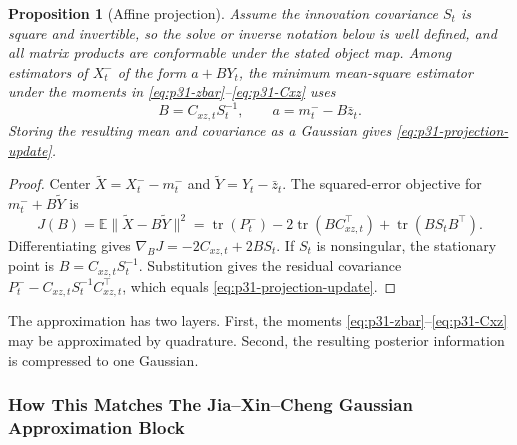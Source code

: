 \documentclass[11pt]{article}
\newtheorem{proposition}{Proposition}
\numberwithin{equation}{section}
\newcommand{\E}{\mathbb E}
\newcommand{\tr}{\operatorname{tr}}
\begin{document}
\begin{proposition}[Affine projection]
\label{prop:p31-affine-projection}
Assume the innovation covariance \(S_t\) is square and invertible, so the solve
or inverse notation below is well defined, and all matrix products are conformable
under the stated object map.  Among estimators of \(X_t^-\) of the form
\(a+B Y_t\), the minimum mean-square estimator under the moments in
\eqref{eq:p31-zbar}--\eqref{eq:p31-Cxz} uses
\begin{equation}
  B=C_{xz,t}S_t^{-1},
  \qquad
  a=m_t^- - B\bar z_t.
  \label{eq:p41-affine-projection-intercept}
\end{equation}
Storing the resulting mean and covariance as a Gaussian gives
\eqref{eq:p31-projection-update}.
\end{proposition}

\begin{proof}
Center \(\widetilde X=X_t^- -m_t^-\) and
\(\widetilde Y=Y_t-\bar z_t\).  The squared-error objective for
\(m_t^-+B\widetilde Y\) is
\begin{equation}
  J(B)=\E\|\widetilde X-B\widetilde Y\|^2
  =
  \tr(P_t^-)-2\tr(BC_{xz,t}^\top)+\tr(BS_tB^\top).
  \label{eq:p31-affine-objective}
\end{equation}
Differentiating gives \(\nabla_BJ=-2C_{xz,t}+2BS_t\).  If \(S_t\) is
nonsingular, the stationary point is \(B=C_{xz,t}S_t^{-1}\).  Substitution gives
the residual covariance \(P_t^- - C_{xz,t}S_t^{-1}C_{xz,t}^\top\), which equals
\eqref{eq:p31-projection-update}.
\end{proof}

The approximation has two layers.  First, the moments
\eqref{eq:p31-zbar}--\eqref{eq:p31-Cxz} may be approximated by quadrature.
Second, the resulting posterior information is compressed to one Gaussian.

\subsubsection{How This Matches The Jia--Xin--Cheng Gaussian Approximation Block}
\label{subsec:p32-jia-gaussian-block}
\end{document}
